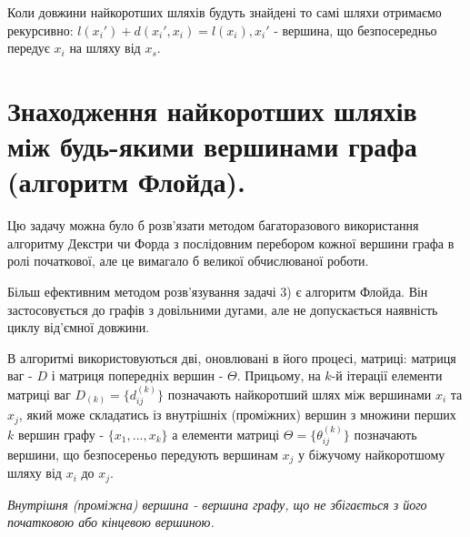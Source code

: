 \documentclass[12pt,a4paper]{report}
\begin{document}
Коли довжини найкоротших шляхів будуть знайдені то самі шляхи отримаємо рекурсивно: $l(x_i')+d(x_i',x_i)=l(x_i), x_i'$ - вершина, що безпосередньо передує $x_i$ на шляху від $x_s$.

\clearpage

\chapter{Знаходження найкоротших шляхів між будь-якими вершинами графа (алгоритм Флойда).}

Цю задачу можна було б розв’язати методом багаторазового використання алгоритму Декстри чи Форда з послідовним перебором кожної вершини графа в ролі початкової, але це вимагало б великої обчислюваної роботи.

Більш ефективним методом розв’язування задачі 3) є алгоритм Флойда. Він застосовується до графів з довільними дугами, але не допускається наявність циклу від’ємної довжини.

В алгоритмі використовуються дві, оновлювані в його процесі, матриці: матриця ваг - $D$ і матриця попередніх вершин - $\Theta$. Прицьому, на $k$-й ітерації елементи матриці ваг $D_{(k)}=\{d_{ij}^{(k)}\}$ позначають найкоротший шлях між вершинами $x_i$ та $x_j$, який може складатись із внутрішніх (проміжних) вершин з множини перших $k$ вершин графу - $\{x_1, ..., x_k\}$ а елементи матриці $\Theta=\{\theta_{ij}^{(k)}\}$ позначають вершини, що безпосереньо передують вершинам $x_j$ у біжучому найкоротшому шляху від $x_i$ до $x_j$.

\emph{Внутрішня (проміжна) вершина - вершина графу, що не збігається з його початковою або кінцевою вершиною.}
\end{document}
